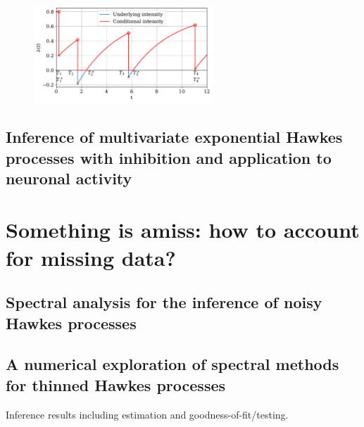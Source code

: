         \begin{figure}[!ht]
            \centering
            \includegraphics[width=0.6\textwidth]{images/chapter2/cooldownTimesMarkedSerif2.pdf}
            \caption{}
            \label{fig:chap0_univariate_underlying_examples}
        \end{figure}



    \subsection{Inference of multivariate exponential Hawkes processes with inhibition and application to neuronal activity}
\section{Something is amiss: how to account for missing data?}\label{sec:chap0_missing_data}
    \subsection{Spectral analysis for the  inference of noisy Hawkes processes}
    \subsection{A numerical exploration of spectral methods for thinned Hawkes processes}
    Inference results including estimation and goodness-of-fit/testing.

    

